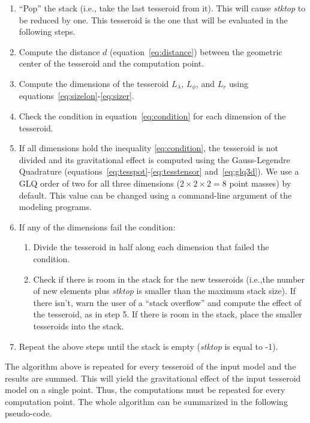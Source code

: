 \documentclass[paper,twocolumn,twoside]{geophysics}
\begin{document}
\begin{enumerate}
    \item ``Pop'' the stack (i.e., take the last tesseroid from it).
        This will cause \emph{stktop} to be reduced by one.
        This tesseroid is the one that will be evaluated in the following
        steps.
    \item Compute the distance $d$ (equation~\ref{eq:distance}) between
        the geometric center of the tesseroid and
        the computation point.
    \item Compute the dimensions of the tesseroid $L_\lambda$, $L_\phi$,
        and $L_r$ using equations~\ref{eq:sizelon}-\ref{eq:sizer}.
    \item Check the condition in equation~\ref{eq:condition} for each
        dimension of the tesseroid.
    \item If all dimensions hold the inequality \ref{eq:condition},
        the tesseroid is not divided and its
        gravitational effect is computed using the
        Gauss-Legendre Quadrature
        (equations~\ref{eq:tesspot}-\ref{eq:tesstensor} and~\ref{eq:glq3d}).
        We use a GLQ order of two for all three dimensions
        ($2 \times 2 \times 2 = 8$ point masses)
        by default.
        This value can be changed using
        a command-line argument of the modeling programs.
    \item If any of the dimensions fail the condition:
    \begin{enumerate}
        \item Divide the tesseroid in half along each dimension that failed
             the condition.
        \item Check if there is room in the stack
            for the new tesseroids
            (i.e.,the number of new elements plus \emph{stktop}
             is smaller than the maximum stack size).
             If there isn't,
             warn the user of a ``stack overflow''
             and compute the effect of the tesseroid, as in step 5.
             If there is room in the stack,
             place the smaller tesseroids into
             the stack.
    \end{enumerate}
    \item Repeat the above steps until the stack is empty
        (\emph{stktop} is equal to -1).
\end{enumerate}

The algorithm above is repeated
for every tesseroid of the input model
and the results are summed.
This will yield the gravitational effect
of the input tesseroid model on a single point.
Thus, the computations must be repeated
for every computation point.
The whole algorithm can be summarized
in the following pseudo-code.
\end{document}
